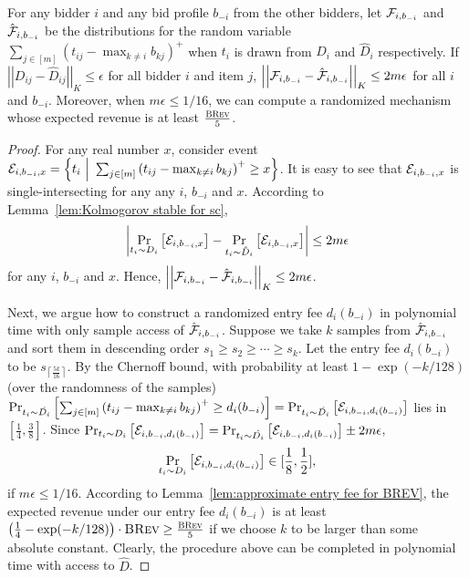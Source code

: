 \begin{lemma}\label{lem:learn approx entry fee from approx dist}
	For any bidder $i$ and any bid profile $b_{-i}$ from the other bidders, let ${\mathcal{F}}_{i,b_{-i}}$ and $\hat{{\mathcal{F}}}_{i,b_{-i}}$ be the distributions for the random variable $\sum_{j\in[m]} \left(t_{ij}-\max_{k\neq i} b_{kj}\right)^+$ when $t_i$ is drawn from $D_i$ and $\hat{D}_i$ respectively. If $\left|\left|D_{ij}-\hat{D}_{ij}\right|\right|_K\leq \epsilon$ for all bidder $i$ and item $j$, $\left|\left|{\mathcal{F}}_{i,b_{-i}}-\hat{{\mathcal{F}}}_{i,b_{-i}}\right|\right|_K\leq 2m\epsilon$ for all $i$ and $b_{-i}$. Moreover, when $m\epsilon\leq 1/16$, we can compute a randomized mechanism whose expected revenue is at least $\frac{\textsc{BRev}}{5}$.
\end{lemma}
\begin{proof}
	For any real number $x$, consider event $\EE_{i,b_{-i},x}=\left\{t_i\ \Big{|}\ \sum_{j\in[m]} \left(t_{ij}-\max_{k\neq i} b_{kj}\right)^+\geq x\right\}$. 
	It is easy to see that ${\mathcal{E}}_{i,b_{-i},x}$ is single-intersecting for any any $i$, $b_{-i}$ and $x$.
	 According to Lemma~\ref{lem:Kolmogorov stable for sc}, $$\left|\Pr_{t_i\sim D_i}\left[{\mathcal{E}}_{i,b_{-i},x}\right]-\Pr_{t_i\sim \hat{D}_i}\left[{\mathcal{E}}_{i,b_{-i},x}\right]\right|\leq 2m\epsilon$$ for any $i$, $b_{-i}$ and $x$. 
	 Hence, $\left|\left|{\mathcal{F}}_{i,b_{-i}}-\hat{{\mathcal{F}}}_{i,b_{-i}}\right|\right|_K\leq 2m\epsilon$. 
	
	Next, we argue how to construct a randomized entry fee $d_i(b_{-i})$ in polynomial time with only sample access of $\hat{{\mathcal{F}}}_{i,b_{-i}}$. 
	Suppose we take $k$ samples from $\hat{{\mathcal{F}}}_{i,b_{-i}}$ and sort them in descending order $s_1\geq s_2\geq \cdots\geq s_k$.
	 Let the entry fee $d_i(b_{-i})$ to be $s_{\left\lceil\frac{5k}{16}\right\rceil}$.
	 By the Chernoff bound, with probability at least $1-\exp(-k/128)$ (over the randomness of the samples) $\Pr_{t_i\sim \hat{D_i}}\left[\sum_{j\in[m]} \left(t_{ij}-\max_{k\neq i} b_{kj}\right)^+\geq d_i(b_{-i}) \right]=\Pr_{t_i\sim \hat{D_i}}\left[{\mathcal{E}}_{i,b_{-i},d_i(b_{-i})}\right]$ lies in $\left[\frac{1}{4},\frac{3}{8}\right]$.
	  Since $\Pr_{t_i\sim D_i}\left[{\mathcal{E}}_{i,b_{-i},d_i(b_{-i})}\right]=\Pr_{t_i\sim \hat{D_i}}\left[{\mathcal{E}}_{i,b_{-i},d_i(b_{-i})}\right]\pm 2m\epsilon$, $$\Pr_{t_i\sim D_i}\left[{\mathcal{E}}_{i,b_{-i},d_i(b_{-i})}\right]\in [\frac{1}{8},\frac{1}{2}],$$ if $m\epsilon\leq 1/16$.
	   According to Lemma~\ref{lem:approximate entry fee for BREV}, the expected revenue under our entry fee $d_i(b_{-i})$ is at least $\left(\frac{1}{4}-\exp(-k/128)\right)\cdot\textsc{BRev}\geq \frac{\textsc{BRev}}{5}$ if we choose $k$ to be larger than some absolute constant. Clearly, the procedure above can be completed in polynomial time with access to $\hat{D}$.
\end{proof}

